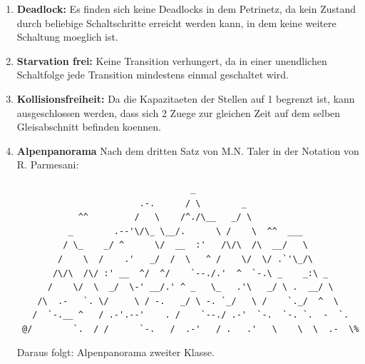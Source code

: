\documentclass{scrreprt}
\begin{document}
\begin{enumerate}
\begin{enumerate}
\item \textbf{Deadlock:} Es finden sich keine Deadlocks in dem Petrinetz, da kein Zustand durch beliebige Schaltschritte erreicht werden kann, in dem keine weitere Schaltung moeglich ist.
\item \textbf{Starvation frei:} Keine Transition verhungert, da in einer unendlichen Schaltfolge jede Transition mindestens einmal geschaltet wird.
\item \textbf{Kollisionsfreiheit:} Da die Kapazitaeten der Stellen auf 1 begrenzt ist, kann ausgeschlossen werden, dass sich 2 Zuege zur gleichen Zeit auf dem selben Gleisabschnitt befinden koennen.
\item \textbf{Alpenpanorama} Nach dem dritten Satz von M{.}N{.} Taler in der Notation von R{.} Parmesani:\\

\newpage

\begin{verbatim}
                                  _
                        .-.      / \        _
            ^^         /   \    /^./\__   _/ \
          _        .--'\/\_ \__/.      \ /    \  ^^  ___
         / \_    _/ ^      \/  __  :'   /\/\  /\  __/   \
        /    \  /    .'   _/  /  \   ^ /    \/  \/ .`'\_/\
       /\/\  /\/ :' __  ^/  ^/    `--./.'  ^  `-.\ _    _:\ _
      /    \/  \  _/  \-' __/.' ^ _   \_   .'\   _/ \ .  __/ \
    /\  .-   `. \/     \ / -.   _/ \ -. `_/   \ /    `._/  ^  \
   /  `-.__ ^   / .-'.--'    . /    `--./ .-'  `-.  `-. `.  -  `.
 @/        `.  / /      `-.   /  .-'   / .   .'   \    \  \  .-  \%
\end{verbatim}
Daraus folgt: Alpenpanorama zweiter Klasse.
\end{enumerate}

\end{enumerate}
\end{document}
